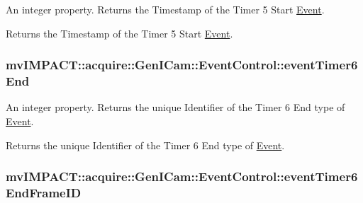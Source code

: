 An integer property. Returns the Timestamp of the Timer 5 Start \hyperlink{classmv_i_m_p_a_c_t_1_1acquire_1_1_event}{Event}. 

Returns the Timestamp of the Timer 5 Start \hyperlink{classmv_i_m_p_a_c_t_1_1acquire_1_1_event}{Event}. \hypertarget{classmv_i_m_p_a_c_t_1_1acquire_1_1_gen_i_cam_1_1_event_control_a7d5ae51ef5f870e602e6cb6910e638ea}{
\subsubsection[{event\+Timer6\+End}]{ mv\+I\+M\+P\+A\+C\+T\+::acquire\+::\+Gen\+I\+Cam\+::\+Event\+Control\+::event\+Timer6\+End}}\label{classmv_i_m_p_a_c_t_1_1acquire_1_1_gen_i_cam_1_1_event_control_a7d5ae51ef5f870e602e6cb6910e638ea}


An integer property. Returns the unique Identifier of the Timer 6 End type of \hyperlink{classmv_i_m_p_a_c_t_1_1acquire_1_1_event}{Event}. 

Returns the unique Identifier of the Timer 6 End type of \hyperlink{classmv_i_m_p_a_c_t_1_1acquire_1_1_event}{Event}. \hypertarget{classmv_i_m_p_a_c_t_1_1acquire_1_1_gen_i_cam_1_1_event_control_a0c16e4a8444ffe593477e1b08e237537}{
\subsubsection[{event\+Timer6\+End\+Frame\+I\+D}]{ mv\+I\+M\+P\+A\+C\+T\+::acquire\+::\+Gen\+I\+Cam\+::\+Event\+Control\+::event\+Timer6\+End\+Frame\+I\+D}}\label{classmv_i_m_p_a_c_t_1_1acquire_1_1_gen_i_cam_1_1_event_control_a0c16e4a8444ffe593477e1b08e237537}


